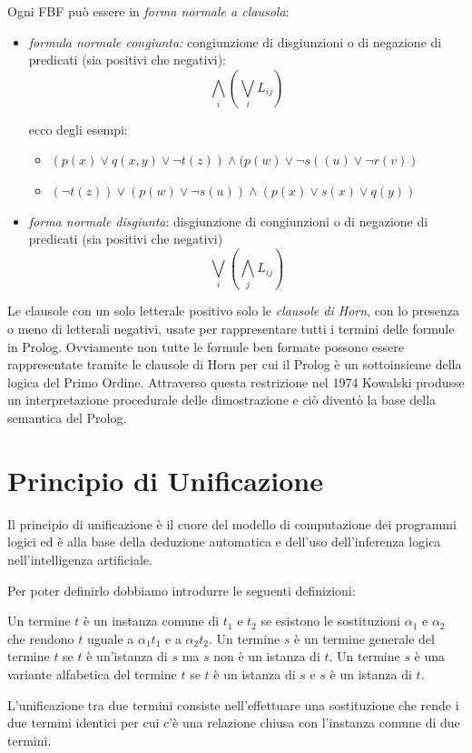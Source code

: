 Ogni FBF può essere in \emph{forma normale a clausola}:
\begin{itemize}
\item \emph{formula normale congiunta:} congiunzione di disgiunzioni o di negazione di predicati (sia positivi che negativi):
  \begin{equation*}
    \bigwedge_i(\bigvee_iL_{ij})
  \end{equation*}
\begin{esempio}
ecco degli esempi:
\begin{itemize}
\item $(p(x)\lor q(x,y)\lor \neg t(z))\land(p(w)\lor \neg s((u)\lor \neg r(v))$
\item $(\neg t(z))\lor (p(w)\lor \neg s(u))\land (p(x)\lor s(x)\lor q(y))$
\end{itemize}
\end{esempio}

\item \textit{forma normale disgiunta}: disgiunzione di congiunzioni o di negazione di predicati (sia positivi che negativi)
  \begin{equation*}
    \bigvee_i(\bigwedge_j L_{ij})
  \end{equation*}
\end{itemize}
Le clausole con un solo letterale positivo solo le \textit{clausole di Horn}, con lo presenza o meno di letterali negativi,
usate per rappresentare tutti i termini delle formule in Prolog.\newline
Ovviamente non tutte le formule ben formate possono essere rappresentate tramite le clausole di Horn per cui il Prolog è un sottoinsieme
della logica del Primo Ordine.\newline
Attraverso questa restrizione nel 1974 Kowalski produsse un interpretazione procedurale delle dimostrazione e ciò diventò la base
della semantica del Prolog.
\section{Principio di Unificazione}
Il principio di unificazione è il cuore del modello di computazione dei programmi logici ed è alla base della deduzione automatica
e dell'uso dell'inferenza logica nell'intelligenza artificiale.

Per poter definirlo dobbiamo introdurre le seguenti definizioni:
\begin{defi}
Un termine $t$ è un instanza comune  di $t_1$ e $t_2$ se esistono le sostituzioni $\alpha_1$ e $\alpha_2$
che rendono $t$ uguale a $\alpha_1t_1$ e a $\alpha_2t_2$.\newline
Un termine $s$ è un termine generale del termine $t$ se $t$ è un'istanza di $s$ ma $s$ non è un istanza di $t$.\newline
Un termine $s$ è una variante alfabetica del termine $t$ se $t$ è un istanza di $s$ e $s$ è un istanza di $t$.
\end{defi}
L'unificazione tra due termini consiste nell'effettuare una sostituzione che rende i due termini identici
per cui c'è una relazione chiusa con l'instanza comune di due termini.

